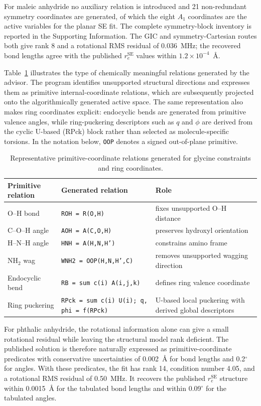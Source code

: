 \documentclass[aip,jcp,reprint,longbibliography,floatfix]{revtex4-2}
\begin{document}
For maleic anhydride no auxiliary relation is introduced and 21
non-redundant symmetry coordinates are generated, of which the eight $A_1$
coordinates are the active variables for the planar SE fit. The complete
symmetry-block inventory is reported in the Supporting Information.
The GIC and symmetry-Cartesian routes both give rank 8 and a rotational RMS
residual of 0.036~MHz; the recovered bond lengths agree with the published
$r_e^\mathrm{SE}$ values within $1.2\times10^{-4}$~\AA.

Table~\ref{tab:generated-relation-example} illustrates the type of chemically
meaningful relations generated by the advisor. The program
identifies unsupported structural directions and expresses them as primitive
internal-coordinate relations, which are subsequently projected onto the
algorithmically generated active space. The same representation also makes
ring coordinates explicit: endocyclic bends are generated from primitive
valence angles, while ring-puckering descriptors such as $q$ and $\phi$ are
derived from the cyclic U-based (RPck) block rather than selected as
molecule-specific torsions.
In the notation below, \texttt{OOP} denotes a signed out-of-plane primitive.

\begin{table}[t]
\caption{Representative primitive-coordinate relations generated for glycine
constraints and ring coordinates.}
\label{tab:generated-relation-example}
\scriptsize
\setlength{\tabcolsep}{4pt}
\begin{tabular}{@{}lll@{}}
\toprule
Primitive relation & Generated relation & Role \\
\midrule
O--H bond & \texttt{ROH = R(O,H)} & fixes unsupported O--H distance \\
C--O--H angle & \texttt{AOH = A(C,O,H)} & preserves hydroxyl orientation \\
H--N--H angle & \texttt{HNH = A(H,N,H')} & constrains amino frame \\
NH$_2$ wag & \texttt{WNH2 = OOP(H,N,H',C)} & removes unsupported wagging direction \\
Endocyclic bend & \texttt{RB = sum c(i) A(i,j,k)} & defines ring valence coordinate \\
Ring puckering & \texttt{RPck = sum c(i) U(i); q, phi = f(RPck)} & U-based local puckering with derived global descriptors \\
\bottomrule
\end{tabular}
\end{table}

For phthalic anhydride, the rotational information alone can give a small
rotational residual while leaving the structural model rank deficient. The
published solution is therefore naturally expressed as primitive-coordinate
predicates with conservative uncertainties of 0.002~\AA{} for bond lengths and
0.2$^\circ$ for angles. With these predicates, the fit has
rank 14, condition number 4.05, and a rotational RMS residual of 0.50~MHz. It
recovers the published $r_e^\mathrm{SE}$ structure within 0.0015~\AA{} for the
tabulated bond lengths and within 0.09$^\circ$ for the tabulated angles.
\end{document}
